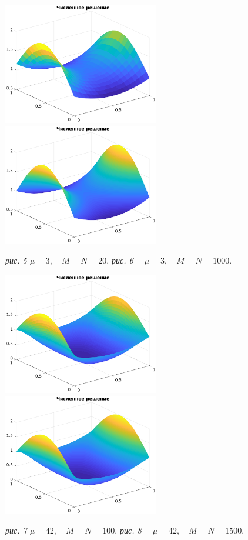 \documentclass[11pt]{article}
\begin{document}
\noindent
\includegraphics[width=0.51\textwidth]{some1.eps}
\includegraphics[width=0.51\textwidth]{some2.eps}
\begin{center}
\it{рис. 5 \quad $\mu = 3, \quad M = N = 20.$ \qquad \qquad \qquad \qquad  рис. 6 $\quad \mu = 3, \quad M = N = 1000.$}
\end{center}

\noindent
\includegraphics[width=0.51\textwidth]{some3.eps}
\includegraphics[width=0.51\textwidth]{some4.eps}
\begin{center}
\it{рис. 7 \quad $\mu = 42, \quad M = N = 100.$ \qquad \qquad \qquad \qquad  рис. 8 $\quad \mu = 42, \quad M = N = 1500.$}
\end{center}
\end{document}

